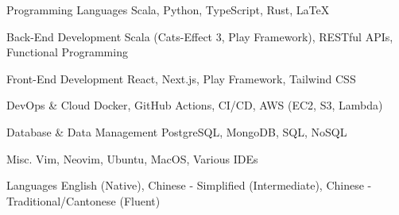 
\begin{cvskills}

  \cvskill
  {Programming Languages} %
  {Scala, Python, TypeScript, Rust, LaTeX} %

  \cvskill
  {Back-End Development} %
  {Scala (Cats-Effect 3, Play Framework), RESTful APIs, Functional Programming} %

  \cvskill
  {Front-End Development} %
  {React, Next.js, Play Framework, Tailwind CSS} %

  \cvskill
  {DevOps \& Cloud} %
  {Docker, GitHub Actions, CI/CD, AWS (EC2, S3, Lambda)} %

  \cvskill
  {Database \& Data Management} %
  {PostgreSQL, MongoDB, SQL, NoSQL} %

\cvskill
  {Misc.} %
  {Vim, Neovim, Ubuntu, MacOS, Various IDEs} %


  \cvskill
  {Languages} %
  {English (Native), Chinese - Simplified (Intermediate), Chinese - Traditional/Cantonese (Fluent)} %

\end{cvskills}
